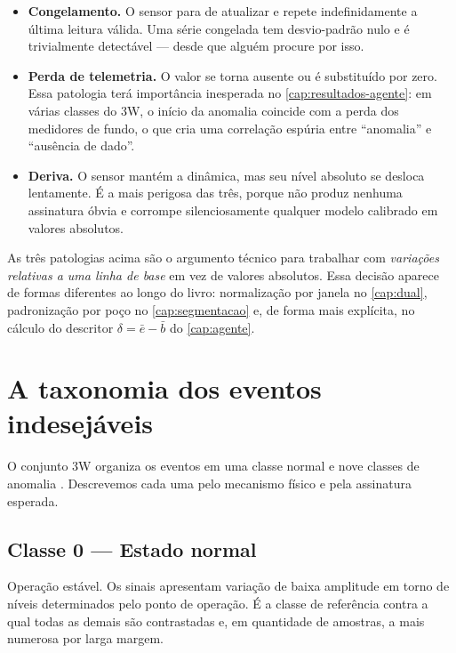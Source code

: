 \begin{itemize}[leftmargin=*,itemsep=0.4em]
  \item \textbf{Congelamento.} O sensor para de atualizar e repete indefinidamente a
        última leitura válida. Uma série congelada tem desvio-padrão nulo e é
        trivialmente detectável --- desde que alguém procure por isso.
  \item \textbf{Perda de telemetria.} O valor se torna ausente ou é substituído por
        zero. Essa patologia terá importância inesperada no
        \cref{cap:resultados-agente}: em várias classes do 3W, o início da anomalia
        coincide com a perda dos medidores de fundo, o que cria uma correlação espúria
        entre ``anomalia'' e ``ausência de dado''.
  \item \textbf{Deriva.} O sensor mantém a dinâmica, mas seu nível absoluto se desloca
        lentamente. É a mais perigosa das três, porque não produz nenhuma assinatura
        óbvia e corrompe silenciosamente qualquer modelo calibrado em valores
        absolutos.
\end{itemize}

\begin{destaque}
As três patologias acima são o argumento técnico para trabalhar com \emph{variações
relativas a uma linha de base} em vez de valores absolutos. Essa decisão aparece de
formas diferentes ao longo do livro: normalização por janela no \cref{cap:dual},
padronização por poço no \cref{cap:segmentacao} e, de forma mais explícita, no cálculo
do descritor $\delta = \bar{e} - \bar{b}$ do \cref{cap:agente}.
\end{destaque}

\section{A taxonomia dos eventos indesejáveis}
\label{sec:dominio-taxonomia}

O conjunto 3W organiza os eventos em uma classe normal e nove classes de anomalia
\citep{VARGAS2019,VazVargas2026_3w2}. Descrevemos cada uma pelo mecanismo físico e pela
assinatura esperada.

\subsection{Classe 0 --- Estado normal}

Operação estável. Os sinais apresentam variação de baixa amplitude em torno de níveis
determinados pelo ponto de operação. É a classe de referência contra a qual todas as
demais são contrastadas e, em quantidade de amostras, a mais numerosa por larga
margem.

